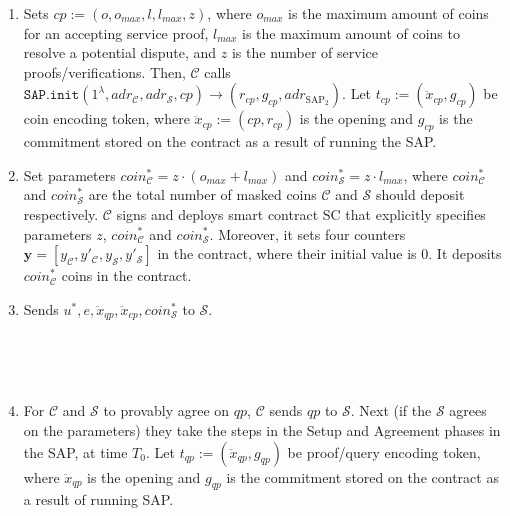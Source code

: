 \begin{enumerate}
\begin{enumerate}
\item  Sets  $cp:=(o,o_{\scriptscriptstyle max},l,l_{\scriptscriptstyle max},z)$, where $o_{\scriptscriptstyle max}$ is the maximum amount of coins  for an accepting service proof,  $l_{\scriptscriptstyle max}$  is the maximum amount of coins to resolve a potential dispute, and $z$ is the number of  service proofs/verifications. Then, $\mathcal C$ calls $\mathtt{SAP.init}(1^{\scriptscriptstyle\lambda}, adr_{\scriptscriptstyle\mathcal{C}}, adr_{\scriptscriptstyle\mathcal{S}},cp )\rightarrow(r_{\scriptscriptstyle cp},g_{\scriptscriptstyle cp},adr_{\scriptscriptstyle\text{SAP}_{\scriptscriptstyle 2}})$.  Let $t_{\scriptscriptstyle cp}:=(\ddot{x}_{\scriptscriptstyle cp},g_{\scriptscriptstyle cp})$ be coin encoding token,  where  $\ddot{x}_{\scriptscriptstyle cp}:=(cp,r_{\scriptscriptstyle cp})$ is the opening and $g_{\scriptscriptstyle cp}$ is the commitment stored on the contract as a result of running the  SAP.  

\item Set parameters  $coin^{\scriptscriptstyle *}_{\scriptscriptstyle\mathcal C}=z\cdot (o_{\scriptscriptstyle max}+l_{\scriptscriptstyle max})$ and $coin^{\scriptscriptstyle *}_{\scriptscriptstyle\mathcal S}=z\cdot l_{\scriptscriptstyle max}$, where $coin^{\scriptscriptstyle *}_{\scriptscriptstyle\mathcal C}$ and $coin^{\scriptscriptstyle *}_{\scriptscriptstyle\mathcal S}$ are   the total number of masked coins $\mathcal C$ and $\mathcal S$ should deposit respectively. $\mathcal C$ signs and deploys  smart contract SC that explicitly specifies  parameters $z$,  $coin^{\scriptscriptstyle *}_{\scriptscriptstyle\mathcal C}$ and $coin^{\scriptscriptstyle *}_{\scriptscriptstyle\mathcal S}$. Moreover, it sets four counters $\bm{y}=[y_{\scriptscriptstyle\mathcal C},y'_{\scriptscriptstyle\mathcal C},y_{\scriptscriptstyle\mathcal S}, y'_{\scriptscriptstyle\mathcal S}]$ in the contract, where their initial value is $0$. It deposits $coin^{\scriptscriptstyle *}_{\scriptscriptstyle\mathcal C}$ coins in the contract.

\item Sends $u^{\scriptscriptstyle *}, e, \ddot{x}_{\scriptscriptstyle qp},\ddot{x}_{\scriptscriptstyle cp}, coin^{\scriptscriptstyle *}_{\scriptscriptstyle\mathcal S}$ to $\mathcal S$. 



\


\


\item For $\mathcal C$ and $\mathcal S$ to provably agree on $qp$, $\mathcal C$ sends $qp$ to  $\mathcal S$.  Next (if the $\mathcal S$ agrees on the parameters) they take the steps in the Setup and Agreement phases in the SAP, at time $T_{\scriptscriptstyle 0}$. Let $t_{\scriptscriptstyle qp}:=(\ddot{x}_{\scriptscriptstyle qp},g_{\scriptscriptstyle qp})$ be proof/query encoding token,  where  $\ddot{x}_{\scriptscriptstyle qp}$ is the opening and $g_{\scriptscriptstyle qp}$ is the commitment stored on the contract as a result of running   SAP. 



\end{enumerate}
\end{enumerate}
